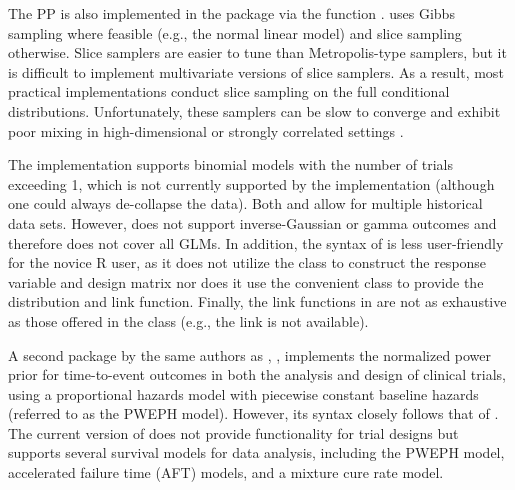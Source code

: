The PP is also implemented in the  package \citep{shen2022bayesppd} via the function .  uses Gibbs sampling where feasible (e.g., the normal linear model) and slice sampling \citep{neal2003slice} otherwise.
Slice samplers are easier to tune than Metropolis-type samplers, but it is difficult to implement multivariate versions of slice samplers. As a result, most practical implementations conduct slice sampling on the full conditional distributions. Unfortunately, these samplers can be slow to converge and exhibit poor mixing in high-dimensional or strongly correlated settings \citep{neal2003slice, murrayEllipticalSliceSampling2010, bloem-reddySliceSamplingHamiltonian2016}.

The  implementation supports binomial models with the number of trials exceeding 1, which is not currently supported by the  implementation  (although one could always de-collapse the data).
Both  and  allow for multiple historical data sets. However,  does not support inverse-Gaussian or gamma outcomes and therefore does not cover all GLMs. In addition, the syntax of  is less user-friendly for the novice R user, as it does not utilize the  class to construct the response variable and design matrix nor does it use the convenient  class to provide the distribution and link function.
Finally, the link functions in  are not as exhaustive as those offered in the  class (e.g., the  link is not available). 

A second package by the same authors as , , implements the normalized power prior for time-to-event outcomes in both the analysis and design of clinical trials, using a proportional hazards model with piecewise constant baseline hazards (referred to as the PWEPH model). However, its syntax closely follows that of . The current version of  does not provide functionality for trial designs but supports several survival models for data analysis, including the PWEPH model, accelerated failure time (AFT) models, and a mixture cure rate model. 

